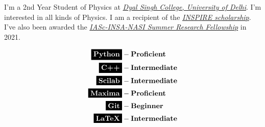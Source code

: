 \documentclass[9pt]{developercv} %
\begin{document}
\vspace{0.5cm}



\begin{minipage}[t]{0.4\textwidth} %
	\vspace{-\baselineskip} %
	
	I’m a 2nd Year Student of Physics at \textit{{\href{http://dsc.du.ac.in/}{Dyal Singh College, University of Delhi}}}. I’m interested in all kinds of Physics. I am a recipient of the \textit{{\href{https://online-inspire.gov.in/}{INSPIRE scholarship}}}. I’ve also been awarded the \textit{{\href{https://web-japps.ias.ac.in:8443/SEP/SummerFellowships.jsp}{IASc-INSA-NASI Summer Research Fellowship}}} in 2021.
\end{minipage}
\hfill %
\begin{minipage}[t]{0.5\textwidth} %
	\vspace{-\baselineskip} %
	\begin{align*}
	\noir{Python} &- \textbf{Proficient} \\
	\noir{C++} &- \textbf{Intermediate} \\
	\noir{Scilab} &- \textbf{Intermediate} \\
	\noir{Maxima} &- \textbf{Proficient} \\
	\noir{Git} &- \textbf{Beginner} \\
	\noir{LaTeX} &- \textbf{Intermediate} 
	\end{align*}
\end{minipage}

\end{document}
